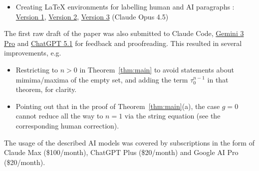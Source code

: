 \documentclass[12pt,reqno]{amsart}
\theoremstyle{definition}
\begin{document}
\begin{humanparagraph}
\begin{itemize}
    \item Creating LaTeX environments for labelling human and AI paragraphs : \href{https://claude.ai/share/27e08d7b-5118-481d-b374-05192aab1ff4}{Version 1}, \href{https://claude.ai/share/969fdd46-3991-44c5-a409-5f79fb2be0dc}{Version 2}, \href{https://claude.ai/share/8a36b89e-79ae-4911-aff7-94960821d350}{Version 3} (Claude Opus 4.5)
\end{itemize}
The first raw draft of the paper was also submitted to Claude Code, \href{https://gemini.google.com/share/65ff8387279c}{Gemini 3 Pro} and \href{https://chatgpt.com/share/693833a5-3e50-8006-b3fd-6592f456f1fb}{ChatGPT 5.1} for feedback and proofreading. This resulted in several improvements, e.g.
\begin{itemize}
    \item Restricting to $n>0$ in Theorem~\ref{thm:main} to avoid statements about mimima/maxima of the empty set, and adding the term $\tau_0^{n-1}$ in that theorem, for clarity.
    \item Pointing out that in the proof of Theorem~\ref{thm:main}(a), the case $g=0$ cannot reduce all the way to $n=1$ via the string equation (see the corresponding human correction).
\end{itemize}
The usage of the described AI models was covered by subscriptions in the form of Claude Max (\$100/month), ChatGPT Plus (\$20/month) and Google AI Pro (\$20/month).
\end{humanparagraph}
\end{document}
